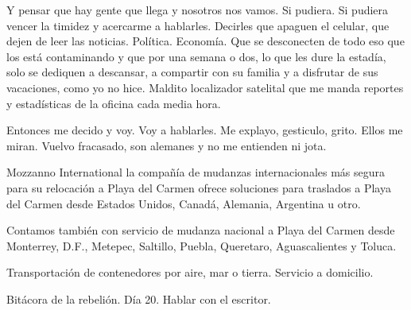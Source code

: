 \documentclass[12pt,twoside,openright,a5paper]{book}
\begin{document}
\vspace{0.5cm}

\hrulefill\hspace{0.2cm} \decofourleft\decofourright \hspace{0.2cm} \hrulefill
\vspace{0.5cm}

Y pensar que hay gente que llega y nosotros
nos vamos. Si pudiera. Si pudiera vencer la timidez y acercarme
a hablarles. Decirles que apaguen el celular, que dejen de leer las
noticias. Política. Economía. Que se desconecten de todo eso que los está
contaminando y que por una semana o dos, lo que les dure la estadía, solo
se dediquen a descansar, a compartir con su familia y a disfrutar de sus
vacaciones, como yo no hice. Maldito localizador satelital que me manda
reportes y estadísticas de la oficina cada media hora.

Entonces me decido y voy. Voy a hablarles. Me explayo, gesticulo,
grito. Ellos me miran. Vuelvo fracasado, son alemanes y no me entienden
ni jota.

\vspace{0.5cm}

\hrulefill\hspace{0.2cm} \decofourleft\decofourright \hspace{0.2cm} \hrulefill
\vspace{0.5cm}

Mozzanno International la compañía de mudanzas internacionales más segura para
su relocación a Playa del Carmen ofrece soluciones para traslados
a Playa del Carmen desde Estados Unidos, Canadá, Alemania, Argentina u otro.

Contamos también con servicio de mudanza nacional a Playa del Carmen desde
Monterrey, D.F., Metepec, Saltillo, Puebla, Queretaro, Aguascalientes y Toluca.

Transportación de contenedores por aire, mar o tierra. Servicio a domicilio.

\vspace{0.5cm}

\hrulefill\hspace{0.2cm} \decofourleft\decofourright \hspace{0.2cm} \hrulefill
\vspace{0.5cm}

Bitácora de la rebelión. Día 20. Hablar con el escritor.

\vspace{0.5cm}
\end{document}
